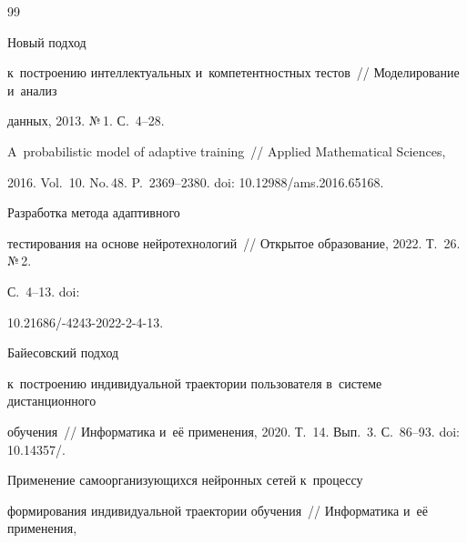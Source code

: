  {\small\frenchspacing


{%




\begin{thebibliography}{99}







 Новый подход 


к~построению интеллектуальных и~компетентностных тестов~/\!\!/ Моделирование и~анализ 


данных, 2013. №\,1. С.~4--28.




 A~probabilistic model of adaptive training~/\!\!/ Applied Mathematical Sciences, 


2016. Vol.~10. No.\,48. P.~2369--2380. doi: 10.12988\!/\!ams.2016.65168.







 Разработка метода адаптивного 


тестирования на основе нейротехнологий~/\!\!/ Открытое образование, 2022. Т.~26. №\,2. 


С.~4--13. doi:  


10.21686\!/-4243-2022-2-4-13.







 Байесовский подход 


к~построению индивидуальной траектории пользователя в~сис\-те\-ме дистанционного  


обуче\-ния~/\!\!/ Информатика и~её применения, 2020. Т.~14. Вып.~3. С.~86--93. doi: 10.14357\!/.




 Применение самоорганизующихся нейронных сетей к~процессу 


формирования индивидуальной траектории обучения~/\!\!/ Информатика и~её применения, 



\end{thebibliography}}}
